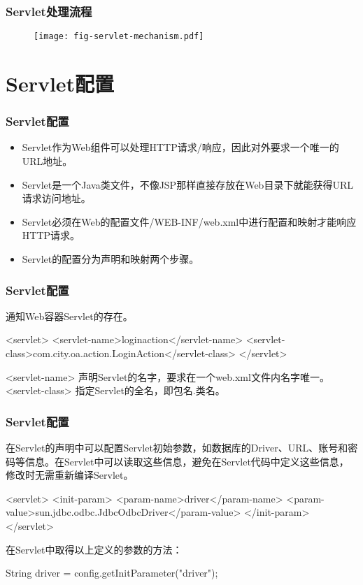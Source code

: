 \begin{frame}[fragile] %
\frametitle{Servlet处理流程} 
\begin{figure}
\centering
\texttt{[image: fig-servlet-mechanism.pdf]}
\end{figure}
\end{frame}

\section{Servlet配置}

\begin{frame}[fragile] %
\frametitle{Servlet配置}
\begin{itemize}
\item Servlet作为Web组件可以处理HTTP请求/响应，因此对外要求一个唯一的URL地址。
\item Servlet是一个Java类文件，不像JSP那样直接存放在Web目录下就能获得URL请求访问地址。
\item Servlet必须在Web的配置文件{\Red /WEB-INF/web.xml}中进行配置和映射才能响应HTTP请求。
\item Servlet的配置分为{\hei 声明和映射}两个步骤。
\end{itemize}
\end{frame}

\begin{frame}[fragile] %
\frametitle{Servlet配置}

通知Web容器Servlet的存在。

\begin{xmlCode}
<servlet>
  <servlet-name>loginaction</servlet-name>
  <servlet-class>com.city.oa.action.LoginAction</servlet-class>
</servlet>  
\end{xmlCode}

<servlet-name> 声明Servlet的名字，要求在一个web.xml文件内名字唯一。\\
<servlet-class> 指定Servlet的全名，即包名.类名。\\
\end{frame}

\begin{frame}[fragile] %
\frametitle{Servlet配置}

在Servlet的声明中可以配置Servlet初始参数，如数据库的Driver、URL、账号和密码等信息。在Servlet中可以读取这些信息，避免在Servlet代码中定义这些信息，修改时无需重新编译Servlet。

\begin{xmlCode}
<servlet>
  <init-param>
    <param-name>driver</param-name>
    <param-value>sun.jdbc.odbc.JdbcOdbcDriver</param-value>
  </init-param>
</servlet>
\end{xmlCode}

在Servlet中取得以上定义的参数的方法：

\begin{javaCode}
String driver = config.getInitParameter("driver");
\end{javaCode}
\end{frame}

